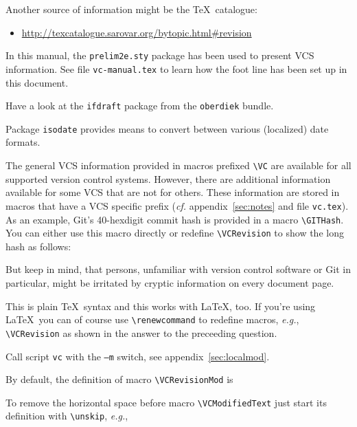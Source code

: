\documentclass[11pt]{article}
\begin{document}
Another source of information might be the \TeX\ catalogue:
\begin{itemize}
\item \url{http://texcatalogue.sarovar.org/bytopic.html#revision}
\end{itemize}
In this manual, the \texttt{prelim2e.sty} package has been used to
present VCS information.  See file \texttt{vc-manual.tex} to learn how
the foot line has been set up in this document.

 Have a look at the \texttt{ifdraft} package from
the \texttt{oberdiek} bundle.

 Package \texttt{isodate} provides means to convert
between various (localized) date formats.

 The general VCS information provided in macros
prefixed \verb+\VC+ are available for all supported version control
systems.  However, there are additional information available for some
VCS that are not for others.  These information are stored in macros
that have a VCS specific prefix (\emph{cf.} appendix~\ref{sec:notes} and
file \texttt{vc.tex}).  As an example, Git's 40-hexdigit commit hash is
provided in a macro \verb+\GITHash+.  You can either use this macro
directly or redefine \verb+\VCRevision+ to show the long hash as
follows:
\begin{listing}[style=TeX]
\renewcommand*{\VCRevision}{\GITHash}
\end{listing}
But keep in mind, that persons, unfamiliar with version control software
or Git in particular, might be irritated by cryptic information on every
document page.

 This is plain \TeX\ syntax and this works with
\LaTeX, too.  If you're using \LaTeX\ you can of course use
\verb+\renewcommand+ to redefine macros, \emph{e.g.}, \verb+\VCRevision+
as shown in the answer to the preceeding question.

 Call script \texttt{vc} with the \texttt{--m}
switch, see appendix~\ref{sec:localmod}.

 By default, the definition of macro
\verb+\VCRevisionMod+ is
\begin{listing}[style=TeX]
\gdef\VCRevisionMod{\VCRevision~\VCModifiedText}
\end{listing}
To remove the horizontal space before macro \verb+\VCModifiedText+ just
start its definition with \verb+\unskip+, \emph{e.g.},
\begin{listing}[style=TeX]
\gdef\VCModifiedText{\unskip, modified}
\end{listing}
\end{document}
